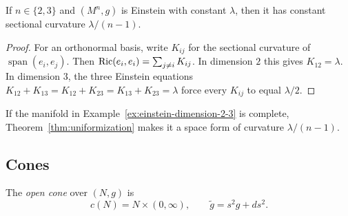 \begin{example}
\label{ex:einstein-dimension-2-3}





If $n\in\{2,3\}$ and $(M^n,g)$ is Einstein with constant $\lambda$,
then it has constant sectional curvature $\lambda/(n-1)$.
\end{example}

\begin{proof}
\sketch
{}

For an orthonormal basis, write $K_{ij}$ for the sectional curvature
of $\operatorname{span}(e_i,e_j)$. Then
$\operatorname{Ric}(e_i,e_i)=\sum_{j\ne i}K_{ij}$. In dimension $2$ this gives
$K_{12}=\lambda$. In dimension $3$, the three Einstein equations
$K_{12}+K_{13}=K_{12}+K_{23}=K_{13}+K_{23}=\lambda$ force every
$K_{ij}$ to equal $\lambda/2$.
\end{proof}

\begin{remark}
\label{rem:einstein-space-form}

If the manifold in Example~\ref{ex:einstein-dimension-2-3} is
complete, Theorem~\ref{thm:uniformization} makes it a space form of
curvature $\lambda/(n-1)$.
\end{remark}

\subsection{Cones}

\begin{definition}
\label{def:cone}


\label{conedefn}
The \emph{open cone} over $(N,g)$ is
\[
  c(N)=N\times(0,\infty),
  \qquad \tilde g=s^2g+ds^2.
\]
\end{definition}


